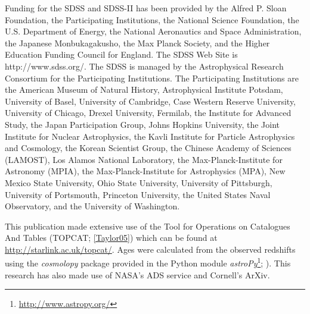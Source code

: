 \documentclass[useAMS,usenatbib]{mn2e}
\begin{document}
Funding for the SDSS and SDSS-II has been provided by the Alfred P. Sloan Foundation, the Participating Institutions, the National Science Foundation, the U.S. Department of Energy, the National Aeronautics and Space Administration, the Japanese Monbukagakusho, the Max Planck Society, and the Higher Education Funding Council for England. The SDSS Web Site is http://www.sdss.org/.
The SDSS is managed by the Astrophysical Research Consortium for the Participating Institutions. The Participating Institutions are the American Museum of Natural History, Astrophysical Institute Potsdam, University of Basel, University of Cambridge, Case Western Reserve University, University of Chicago, Drexel University, Fermilab, the Institute for Advanced Study, the Japan Participation Group, Johns Hopkins University, the Joint Institute for Nuclear Astrophysics, the Kavli Institute for Particle Astrophysics and Cosmology, the Korean Scientist Group, the Chinese Academy of Sciences (LAMOST), Los Alamos National Laboratory, the Max-Planck-Institute for Astronomy (MPIA), the Max-Planck-Institute for Astrophysics (MPA), New Mexico State University, Ohio State University, University of Pittsburgh, University of Portsmouth, Princeton University, the United States Naval Observatory, and the University of Washington.

This publication made extensive use of the Tool for Operations on Catalogues And Tables (TOPCAT; \ref{Taylor05}) which can be found at \url{http://starlink.ac.uk/topcat/}. Ages were calculated from the observed redshifts using the \emph{cosmolopy} package provided in the Python module \emph{astroPy}\footnote{\url{http://www.astropy.org/}}; \citealt{Rob13}). This research has also made use of NASA's ADS service and Cornell's ArXiv. 
\end{document}
